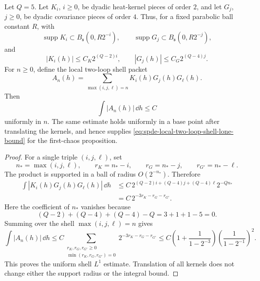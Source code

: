 \begin{corollary}
\label{cor:spde-local-kg2-shell-lone-bound}
Let \(Q=5\).  Let \(K_i\), \(i\geq0\), be dyadic heat-kernel pieces of
order \(2\), and let \(G_j\), \(j\geq0\), be dyadic covariance pieces of
order \(4\).  Thus, for a fixed parabolic ball constant \(R\),
with
\[
  \operatorname{supp}K_i\subset B_{\mathfrak s}(0,R2^{-i}),
  \qquad
  \operatorname{supp}G_j\subset B_{\mathfrak s}(0,R2^{-j}),
\]
and
\[
  |K_i(h)|\leq C_K2^{(Q-2)i},\qquad
  |G_j(h)|\leq C_G2^{(Q-4)j}.
\]
For \(n\geq0\), define the local two-loop shell packet
\[
  A_n(h)
  =
  \sum_{\max(i,j,\ell)=n}K_i(h)G_j(h)G_\ell(h).
\]
Then
\begin{equation}
  \int |A_n(h)|\,\dd h
  \leq C
  \label{eq:spde-kg2-shell-lone-bound-verified}
\end{equation}
uniformly in \(n\).  The same estimate holds uniformly in a base point
after translating the kernels, and hence supplies
\eqref{eq:spde-local-two-loop-shell-lone-bound} for the first-chaos
proposition.
\end{corollary}

\begin{proof}
For a single triple \((i,j,\ell)\), set
\[
  n_*=\max(i,j,\ell),\qquad
  r_K=n_*-i,\qquad r_G=n_*-j,\qquad r_{G'}=n_*-\ell .
\]
The product is supported in a ball of radius \(O(2^{-n_*})\).  Therefore
\[
\begin{aligned}
  \int |K_i(h)G_j(h)G_\ell(h)|\,\dd h
  &\leq
  C\,2^{(Q-2)i+(Q-4)j+(Q-4)\ell}2^{-Qn_*}  \\
  &=
  C\,2^{-3r_K-r_G-r_{G'}} .
\end{aligned}
\]
Here the coefficient of \(n_*\) vanishes because
\[
  (Q-2)+(Q-4)+(Q-4)-Q=3+1+1-5=0 .
\]
Summing over the shell \(\max(i,j,\ell)=n\) gives
\[
  \int |A_n(h)|\,\dd h
  \leq
  C
  \sum_{\substack{r_K,r_G,r_{G'}\geq0\\ \min(r_K,r_G,r_{G'})=0}}
  2^{-3r_K-r_G-r_{G'}}
  \leq
  C
  \left(1+\frac{1}{1-2^{-3}}\right)
  \left(\frac{1}{1-2^{-1}}\right)^2 .
\]
This proves the uniform shell \(L^1\) estimate.  Translation of all kernels
does not change either the support radius or the integral bound.
\end{proof}

